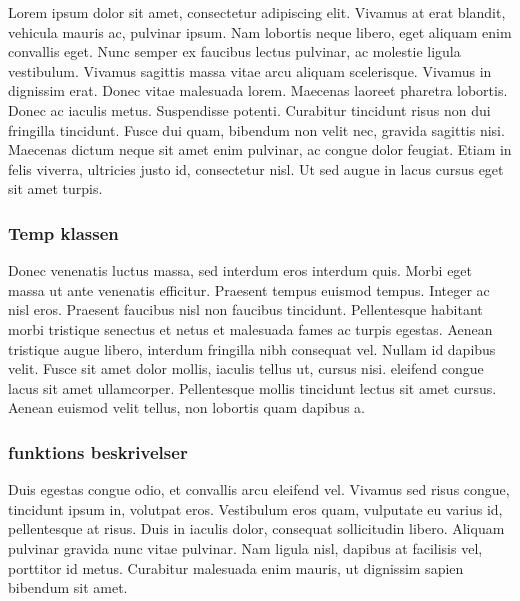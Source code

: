 Lorem ipsum dolor sit amet, consectetur adipiscing elit. Vivamus at erat blandit, vehicula mauris ac, pulvinar ipsum. Nam lobortis neque libero, eget aliquam enim convallis eget. Nunc semper ex faucibus lectus pulvinar, ac molestie ligula vestibulum. Vivamus sagittis massa vitae arcu aliquam scelerisque. Vivamus in dignissim erat. Donec vitae malesuada lorem. Maecenas laoreet pharetra lobortis. Donec ac iaculis metus. Suspendisse potenti. Curabitur tincidunt risus non dui fringilla tincidunt. Fusce dui quam, bibendum non velit nec, gravida sagittis nisi. Maecenas dictum neque sit amet enim pulvinar, ac congue dolor feugiat. Etiam in felis viverra, ultricies justo id, consectetur nisl. Ut sed augue in lacus  cursus eget sit amet turpis.


\subsubsection{Temp klassen}
Donec venenatis luctus massa, sed interdum eros interdum quis. Morbi eget massa ut ante venenatis efficitur. Praesent tempus euismod tempus. Integer ac nisl eros. Praesent faucibus nisl non faucibus tincidunt. Pellentesque habitant morbi tristique senectus et netus et malesuada fames ac turpis egestas. Aenean tristique augue libero, interdum fringilla nibh consequat vel. Nullam id dapibus velit. Fusce sit amet dolor mollis, iaculis tellus ut, cursus nisi.  eleifend congue lacus sit amet ullamcorper. Pellentesque mollis tincidunt lectus sit amet cursus. Aenean euismod velit tellus, non lobortis quam dapibus a.


\subsubsection{funktions beskrivelser}
Duis egestas congue odio, et convallis arcu eleifend vel. Vivamus sed risus congue, tincidunt ipsum in, volutpat eros. Vestibulum eros quam, vulputate eu varius id, pellentesque at risus. Duis in iaculis dolor, consequat sollicitudin libero. Aliquam pulvinar gravida nunc vitae pulvinar. Nam ligula nisl, dapibus at facilisis vel, porttitor id metus. Curabitur malesuada enim mauris, ut dignissim sapien bibendum sit amet.